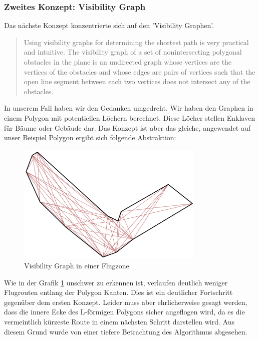 \subsubsection{Zweites Konzept: Visibility Graph}
Das nächste Konzept konzentrierte sich auf den 'Visibility Graphen'. 
\cite[p.1]{IEEEPaper} 
\blockquote{Using visibility graphs for determining the shortest path is very practical and intuitive. The visibility graph of a set of nonintersecting polygonal obstacles in the plane is an undirected graph whose vertices are the vertices of the obstacles and whose edges are pairs of vertices such that the open line segment between each two vertices does not intersect any of the obstacles.}
In unserem Fall haben wir den Gedanken umgedreht. Wir haben den Graphen in einem Polygon mit potentiellen Löchern berechnet. Diese Löcher stellen Enklaven für Bäume oder Gebäude dar. Das Konzept ist aber das gleiche, angewendet auf unser Beispiel Polygon ergibt sich folgende Abstraktion:
\begin{figure}[h]
	\centering
	\includegraphics[width=0.8\textwidth]{images/routing/visibilityGraph.png}
	\caption{Visibility Graph in einer Flugzone}
	\label{fig:visibility-graph}
\end{figure}
Wie in der Grafik \ref{fig:visibility-graph} unschwer zu erkennen ist, verlaufen deutlich weniger Flugrouten entlang der Polygon Kanten. 
Dies ist ein deutlicher Fortschritt gegenüber dem ersten Konzept. Leider muss aber ehrlicherweise gesagt werden, dass die innere Ecke des L-förmigen Polygons sicher angeflogen wird, da es die vermeintlich kürzeste Route in einem nächsten Schritt darstellen wird. Aus diesem Grund wurde von einer tiefere Betrachtung des Algorithmus abgesehen.
\\
